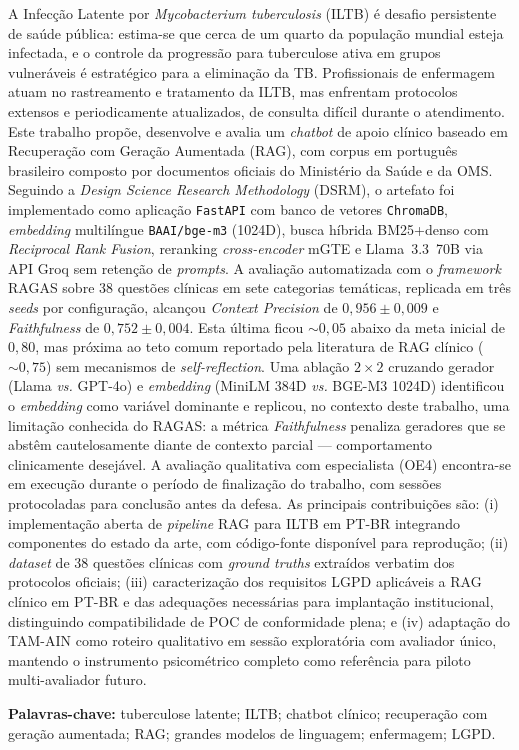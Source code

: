 \documentclass[
  12pt,
  oneside,
  a4paper,
  english,
  brazil
]{abntex2}
\begin{document}
\begin{resumo}

A Infecção Latente por \textit{Mycobacterium tuberculosis} (ILTB) é
desafio persistente de saúde pública: estima-se que cerca de um quarto
da população mundial esteja infectada, e o controle da progressão para
tuberculose ativa em grupos vulneráveis é estratégico para a eliminação
da TB. Profissionais de enfermagem atuam no rastreamento e tratamento da
ILTB, mas enfrentam protocolos extensos e periodicamente atualizados, de
consulta difícil durante o atendimento. Este trabalho propõe, desenvolve
e avalia um \textit{chatbot} de apoio clínico baseado em Recuperação com
Geração Aumentada (RAG), com corpus em português brasileiro composto por
documentos oficiais do Ministério da Saúde e da OMS. Seguindo a
\textit{Design Science Research Methodology} (DSRM), o artefato foi
implementado como aplicação \texttt{FastAPI} com banco de vetores
\texttt{ChromaDB}, \textit{embedding} multilíngue \texttt{BAAI/bge-m3}
(1024D), busca híbrida BM25+denso com \textit{Reciprocal Rank Fusion},
reranking \textit{cross-encoder} mGTE e Llama~3.3~70B via API Groq sem
retenção de \textit{prompts}. A avaliação automatizada com o
\textit{framework} RAGAS sobre 38 questões clínicas em sete categorias
temáticas, replicada em três \textit{seeds} por configuração, alcançou
\textit{Context Precision} de $0{,}956 \pm 0{,}009$ e
\textit{Faithfulness} de $0{,}752 \pm 0{,}004$. Esta última ficou
$\sim 0{,}05$ abaixo da meta inicial de $0{,}80$, mas próxima ao teto
comum reportado pela literatura de RAG clínico ($\sim 0{,}75$) sem
mecanismos de \textit{self-reflection}. Uma ablação $2 \times 2$ cruzando
gerador (Llama \textit{vs.} GPT-4o) e \textit{embedding} (MiniLM 384D
\textit{vs.} BGE-M3 1024D) identificou o \textit{embedding} como
variável dominante e replicou, no contexto deste trabalho, uma limitação
conhecida do RAGAS: a métrica \textit{Faithfulness} penaliza geradores
que se abstêm cautelosamente diante de contexto parcial --- comportamento
clinicamente desejável. A avaliação qualitativa com especialista (OE4)
encontra-se em execução durante o período de finalização do trabalho,
com sessões protocoladas para conclusão antes da defesa. As principais
contribuições são: (i) implementação aberta de \textit{pipeline} RAG para
ILTB em PT-BR integrando componentes do estado da arte, com código-fonte
disponível para reprodução; (ii) \textit{dataset} de 38 questões
clínicas com \textit{ground truths} extraídos verbatim dos protocolos
oficiais; (iii) caracterização dos requisitos LGPD aplicáveis a RAG
clínico em PT-BR e das adequações necessárias para implantação
institucional, distinguindo compatibilidade de POC de conformidade
plena; e (iv) adaptação do TAM-AIN como roteiro qualitativo em sessão
exploratória com avaliador único, mantendo o instrumento psicométrico
completo como referência para piloto multi-avaliador futuro.

\vspace{\onelineskip}
\noindent\textbf{Palavras-chave:} tuberculose latente; ILTB; chatbot clínico;
recuperação com geração aumentada; RAG; grandes modelos de linguagem; enfermagem;
LGPD.
\end{resumo}
\end{document}
